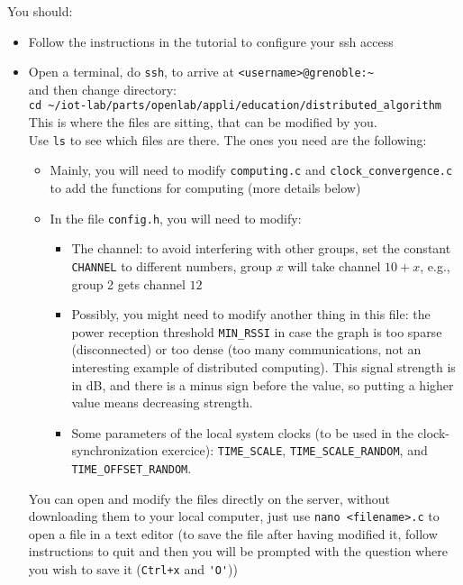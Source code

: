 \documentclass{article}
\begin{document}
You should:
\begin{itemize}
\item Follow the instructions in the tutorial to configure your ssh access
\item Open a  terminal, do \verb=ssh=, to arrive at \verb=<username>@grenoble:~= \\
and then change directory:\\
\verb=cd ~/iot-lab/parts/openlab/appli/education/distributed_algorithm= \\
This is where the files are sitting, that can be modified by you.\\

Use \verb=ls= to see which files are there. The ones you need are the following:
	\begin{itemize}
	\item Mainly, you will need to modify \verb=computing.c= and \verb=clock_convergence.c= to add the functions for computing (more details below)
	\item In the file \verb=config.h=, you will need to modify:
		\begin{itemize}

		\item The channel: to avoid interfering with other groups, set the
            constant \verb=CHANNEL= to different numbers, group $x$ will take
            channel $10+x$, e.g., group 2 gets channel $12$
		\item Possibly, you might  need to modify another thing in this file:
            the power reception threshold \verb=MIN_RSSI= in case the graph is
            too sparse (disconnected) or too dense (too many communications, not
            an interesting example of distributed computing). This signal
            strength is in dB, and there is a minus sign before the value,
            so putting a higher value means decreasing strength.
         \item Some parameters of the local system clocks (to be used in the clock-synchronization exercice): \verb=TIME_SCALE=, \verb=TIME_SCALE_RANDOM=, and \verb=TIME_OFFSET_RANDOM=.
		\end{itemize}
	\end{itemize}
You can open and modify the files directly on the server, without downloading
them to your local computer, just use \verb=nano <filename>.c= to open a file in
a text editor (to save the file after having modified it, follow instructions to
quit and then you will be prompted with the question where you wish to save it
(\verb=Ctrl+x= and \verb='O'=))


\end{itemize}
\end{document}

